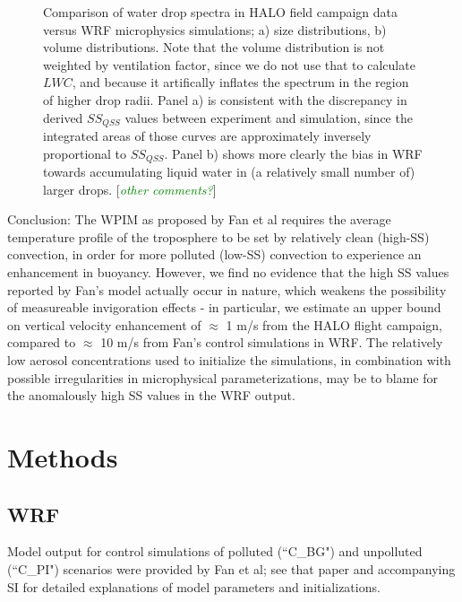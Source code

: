 \documentclass{article}
\newcommand{\todo}[1]{\textcolor{green}{\textit{#1}}}
\begin{document}
\begin{figure}[ht]
\begin{subfigure}{0.7\textwidth}
		\label{compvoldistb}
		\caption{}
	\end{subfigure}
	\caption{Comparison of water drop spectra in HALO field campaign data versus WRF microphysics simulations; a) size distributions, b) volume distributions. Note that the volume distribution is not weighted by ventilation factor, since we do not use that to calculate $LWC$, and because it artifically inflates the spectrum in the region of higher drop radii. Panel a) is consistent with the discrepancy in derived $SS_{QSS}$ values between experiment and simulation, since the integrated areas of those curves are approximately inversely proportional to $SS_{QSS}$. Panel b) shows more clearly the bias in WRF towards accumulating liquid water in (a relatively small number of) larger drops. [\todo{other comments?}]}
	\label{compdistb}
\end{figure}

Conclusion: The WPIM as proposed by Fan et al requires the average temperature profile of the troposphere to be set by relatively clean (high-SS) convection, in order for more polluted (low-SS) convection to experience an enhancement in buoyancy. However, we find no evidence that the high SS values reported by Fan's model actually occur in nature, which weakens the possibility of measureable invigoration effects - in particular, we estimate an upper bound on vertical velocity enhancement of $\approx$ 1 m/s from the HALO flight campaign, compared to $\approx$ 10 m/s from Fan's control simulations in WRF. The relatively low aerosol concentrations used to initialize the simulations, in combination with possible irregularities in microphysical parameterizations, may be to blame for the anomalously high SS values in the WRF output.

\clearpage
\newpage

\section{Methods}

\subsection{WRF}

Model output for control simulations of polluted (``C\_BG") and unpolluted (``C\_PI") scenarios were provided by Fan et al; see that paper and accompanying SI for detailed explanations of model parameters and initializations.
\end{document}
